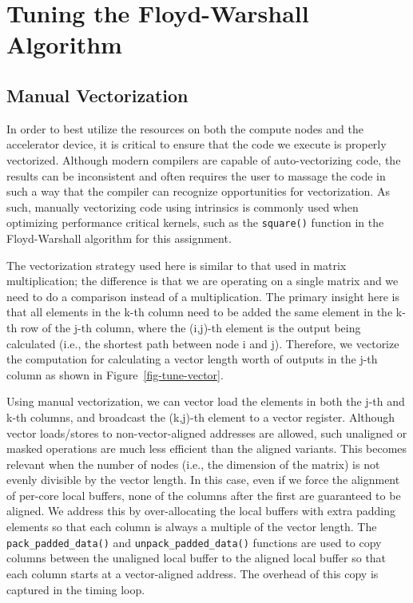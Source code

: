 
\section{Tuning the Floyd-Warshall Algorithm}
\label{sec-tune}

\subsection{Manual Vectorization}
\label{sec-tune-vector}

In order to best utilize the resources on both the compute nodes and the
accelerator device, it is critical to ensure that the code we execute is
properly vectorized. Although modern compilers are capable of
auto-vectorizing code, the results can be inconsistent and often requires
the user to massage the code in such a way that the compiler can
recognize opportunities for vectorization. As such, manually vectorizing
code using intrinsics is commonly used when optimizing performance
critical kernels, such as the \texttt{square()} function in the
Floyd-Warshall algorithm for this assignment.



The vectorization strategy used here is similar to that used in matrix
multiplication; the difference is that we are operating on a single
matrix and we need to do a comparison instead of a multiplication. The
primary insight here is that all elements in the k-th column need to be
added the same element in the k-th row of the j-th column, where
the (i,j)-th element is the output being calculated (i.e., the shortest
path between node i and j). Therefore, we vectorize the computation for
calculating a vector length worth of outputs in the j-th column as shown
in Figure~\ref{fig-tune-vector}.

Using manual vectorization, we can vector load the elements in both the
j-th and k-th columns, and broadcast the (k,j)-th element to a vector
register. Although vector loads/stores to non-vector-aligned addresses are
allowed, such unaligned or masked operations are much less efficient
than the aligned variants. This becomes relevant when the number of nodes
(i.e., the dimension of the matrix) is not evenly divisible by the vector
length. In this case, even if we force the alignment of per-core local
buffers, none of the columns after the first are guaranteed to be
aligned. We address this by over-allocating the local buffers with extra
padding elements so that each column is always a multiple of the vector
length. The \texttt{pack\_padded\_data()} and
\texttt{unpack\_padded\_data()} functions are used to copy columns
between the unaligned local buffer to the aligned local buffer so that
each column starts at a vector-aligned address. The overhead of this copy
is captured in the timing loop.


